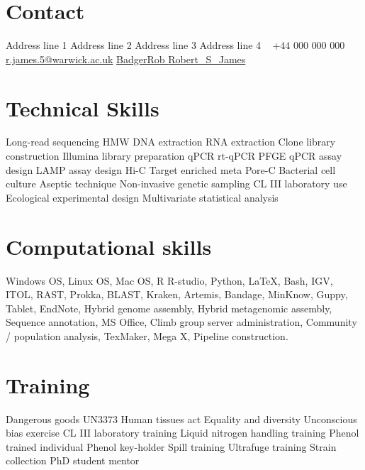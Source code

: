 \documentclass[hidelinks]{james-cv} %
\begin{document}

\begin{aside} 
\section{Contact}
Address line 1
Address line 2
Address line 3
Address line 4
~
\color{black}\bodyfontcontact +$44$ $000$ $000$ $000$ \Mobilefone
\color{blue}\href{mailto:r.james.5@warwick.ac.uk}{r.james.5@warwick.ac.uk} \color{black}\Envelope
\color{blue}\href{https://github.com/BadgerRob}{BadgerRob } \color{black}\faGithub
\color{blue}\href{http://twitter.com/Robert_S_James}{Robert\_S\_James} \color{black}\faTwitter

\headingfont\section{Technical Skills}
\thinfont\footnotesize{} Long-read sequencing \textbullet{}
HMW DNA extraction \textbullet{}
RNA extraction \textbullet{}
Clone library construction \textbullet{}
Illumina library preparation \textbullet{}
qPCR \textbullet{}
rt-qPCR \textbullet{}
PFGE \textbullet{}
qPCR assay design \textbullet{}
LAMP assay design \textbullet{}
Hi-C \textbullet{}
Target enriched meta Pore-C \textbullet{}
Bacterial cell culture \textbullet{}
Aseptic technique \textbullet{}
Non-invasive genetic sampling \textbullet{}
CL III laboratory use \textbullet{}
Ecological experimental design \textbullet{}
Multivariate statistical analysis \textbullet{}

\headingfont\section{Computational skills}
\emergencystretch=5pt\justify\thinfont\footnotesize\nolinebreak{}Windows OS, Linux OS, Mac OS, R R-studio, Python, \LaTeX, Bash, IGV, ITOL, RAST, Prokka, BLAST, Kraken, Artemis, Bandage, MinKnow, Guppy, Tablet, EndNote, Hybrid genome assembly, Hybrid metagenomic assembly, Sequence annotation, MS Office, Climb group server administration, Community / population analysis, TexMaker, Mega X, Pipeline construction.\headingfont\flushright\section{Training}
\flushright\thinfont\footnotesize{} 
Dangerous goods UN3373 \textbullet{}
Human tissues act \textbullet{}
Equality and diversity \textbullet{}
Unconscious bias exercise \textbullet{}
CL III laboratory training \textbullet{}
Liquid nitrogen handling training \textbullet{}
Phenol trained individual \textbullet{}
Phenol key-holder \textbullet{}
Spill training \textbullet{}
Ultrafuge training \textbullet{}
Strain collection \textbullet{}
PhD student mentor \textbullet{}
\end{aside}
\end{document}
